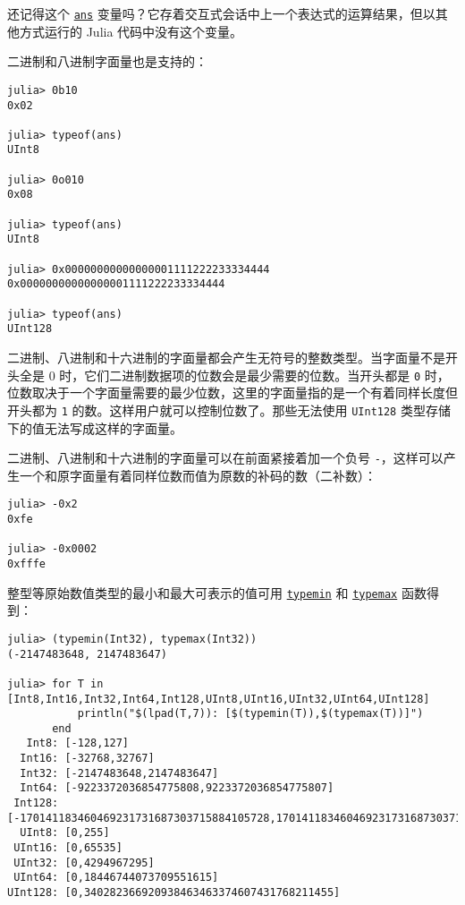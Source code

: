 还记得这个 \hyperlink{11288188119698492222}{\texttt{ans}} 变量吗？它存着交互式会话中上一个表达式的运算结果，但以其他方式运行的 Julia 代码中没有这个变量。



二进制和八进制字面量也是支持的：




\begin{verbatim}
julia> 0b10
0x02

julia> typeof(ans)
UInt8

julia> 0o010
0x08

julia> typeof(ans)
UInt8

julia> 0x00000000000000001111222233334444
0x00000000000000001111222233334444

julia> typeof(ans)
UInt128
\end{verbatim}



二进制、八进制和十六进制的字面量都会产生无符号的整数类型。当字面量不是开头全是 0 时，它们二进制数据项的位数会是最少需要的位数。当开头都是 \texttt{0} 时，位数取决于一个字面量需要的最少位数，这里的字面量指的是一个有着同样长度但开头都为 \texttt{1} 的数。这样用户就可以控制位数了。那些无法使用 \texttt{UInt128} 类型存储下的值无法写成这样的字面量。



二进制、八进制和十六进制的字面量可以在前面紧接着加一个负号 \texttt{-}，这样可以产生一个和原字面量有着同样位数而值为原数的补码的数（二补数）：




\begin{verbatim}
julia> -0x2
0xfe

julia> -0x0002
0xfffe
\end{verbatim}



整型等原始数值类型的最小和最大可表示的值可用 \hyperlink{3613894539247233488}{\texttt{typemin}} 和 \hyperlink{17760305803764597758}{\texttt{typemax}} 函数得到：




\begin{verbatim}
julia> (typemin(Int32), typemax(Int32))
(-2147483648, 2147483647)

julia> for T in [Int8,Int16,Int32,Int64,Int128,UInt8,UInt16,UInt32,UInt64,UInt128]
           println("$(lpad(T,7)): [$(typemin(T)),$(typemax(T))]")
       end
   Int8: [-128,127]
  Int16: [-32768,32767]
  Int32: [-2147483648,2147483647]
  Int64: [-9223372036854775808,9223372036854775807]
 Int128: [-170141183460469231731687303715884105728,170141183460469231731687303715884105727]
  UInt8: [0,255]
 UInt16: [0,65535]
 UInt32: [0,4294967295]
 UInt64: [0,18446744073709551615]
UInt128: [0,340282366920938463463374607431768211455]
\end{verbatim}



